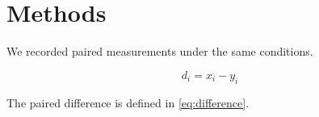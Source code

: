 \chapter{Methods}
\label{chap:methods}

We recorded paired measurements under the same conditions.

\begin{equation}
  d_i=x_i-y_i
  \label{eq:difference}
\end{equation}

The paired difference is defined in \cref{eq:difference}.
